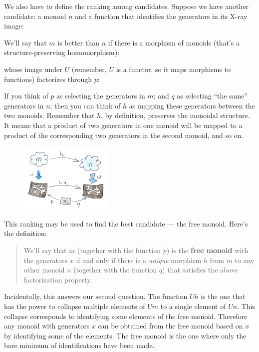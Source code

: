 \noindent
We also have to define the ranking among candidates. Suppose we have
another candidate: a monoid $n$ and a function that identifies
the generators in its X-ray image:

We'll say that $m$ is better than $n$ if there is a
morphism of monoids (that's a structure-preserving homomorphism):

whose image under $U$ (remember, $U$ is a functor, so it
maps morphisms to functions) factorizes through $p$:

If you think of $p$ as selecting the generators in $m$;
and $q$ as selecting ``the same'' generators in $n$; then
you can think of $h$ as mapping these generators between the two
monoids. Remember that $h$, by definition, preserves the monoidal
structure. It means that a product of two generators in one monoid will
be mapped to a product of the corresponding two generators in the second
monoid, and so on.

\begin{figure}[H]
\centering
\includegraphics[width=0.4\textwidth]{images/monoid-ranking.jpg}
\end{figure}

\noindent
This ranking may be used to find the best candidate --- the free monoid.
Here's the definition:

\begin{quote}
We'll say that $m$ (together with the function $p$) is the
\textbf{free monoid} with the generators $x$ if and only if there
is a \emph{unique} morphism $h$ from $m$ to any other
monoid $n$ (together with the function $q$) that satisfies
the above factorization property.
\end{quote}
Incidentally, this answers our second question. The function
$U h$ is the one that has the power to collapse multiple
elements of $U m$ to a single element of $U n$. This
collapse corresponds to identifying some elements of the free monoid.
Therefore any monoid with generators $x$ can be obtained from the
free monoid based on $x$ by identifying some of the elements. The
free monoid is the one where only the bare minimum of identifications
have been made.

